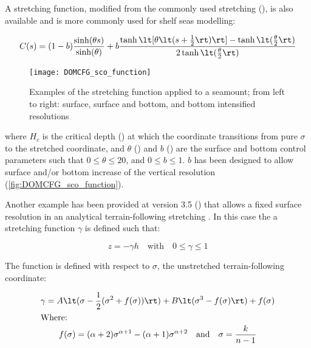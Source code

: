 \documentclass[../main/NEMO_manual]{subfiles}
\begin{document}
A stretching function,
modified from the commonly used \citet{song.haidvogel_JCP94} stretching (),
is also available and is more commonly used for shelf seas modelling:

\[
  C(s) =   (1 - b) \frac{\sinh(\theta s)}{\sinh(\theta)}
         + b       \frac{\tanh \lt[ \theta \lt(s + \frac{1}{2} \rt) \rt] -   \tanh \lt( \frac{\theta}{2} \rt)}
                        {                                                  2 \tanh \lt( \frac{\theta}{2} \rt)}
 \label{eq:DOMCFG_SH94_2}
\]

\begin{figure}[!ht]
  \centering
  \texttt{[image: DOMCFG\_sco\_function]}
  \caption[DOMAINcfg: examples of the stretching function applied to a seamount]{
    Examples of the stretching function applied to a seamount;
    from left to right: surface, surface and bottom, and bottom intensified resolutions}
  \label{fig:DOMCFG_sco_function}
\end{figure}

where $H_c$ is the critical depth () at which the coordinate transitions from pure $\sigma$ to
the stretched coordinate, and $\theta$ () and $b$ () are the surface and
bottom control parameters such that $0 \leqslant \theta \leqslant 20$, and $0 \leqslant b \leqslant 1$.
$b$ has been designed to allow surface and/or bottom increase of the vertical resolution
(\autoref{fig:DOMCFG_sco_function}).

Another example has been provided at version 3.5 () that allows a fixed surface resolution in
an analytical terrain-following stretching \citet{siddorn.furner_OM13}.
In this case the a stretching function $\gamma$ is defined such that:

\begin{equation}
  z = - \gamma h \quad \text{with} \quad 0 \leq \gamma \leq 1
\end{equation}

The function is defined with respect to $\sigma$, the unstretched terrain-following coordinate:

\begin{gather*}
  \gamma =   A \lt( \sigma   - \frac{1}{2} (\sigma^2     + f (\sigma)) \rt)
           + B \lt( \sigma^3 - f           (\sigma) \rt) + f (\sigma)       \\
  \intertext{Where:}
 \label{eq:DOMCFG_gamma}
  f(\sigma) = (\alpha + 2) \sigma^{\alpha + 1} - (\alpha + 1) \sigma^{\alpha + 2}
  \quad \text{and} \quad \sigma = \frac{k}{n - 1}
\end{gather*}
\end{document}
